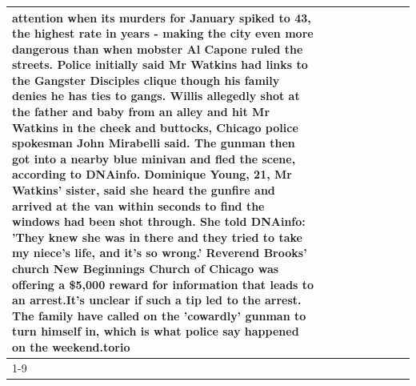 \begin{table}[H]
\begin{tabular}{lllrlllll}
attention when its murders for January spiked to 43, the highest rate in years - making the city even more dangerous than when mobster Al Capone ruled the streets. Police initially said Mr Watkins had links to the Gangster Disciples clique though his family denies he has ties to gangs. Willis allegedly shot at the father and baby from an alley and hit Mr Watkins in the cheek and buttocks, Chicago police spokesman John Mirabelli said. The gunman then got into a nearby blue minivan and fled the scene, according to DNAinfo. Dominique Young, 21, Mr Watkins' sister, said she heard the gunfire and arrived at the van within seconds to find the windows had been shot through. She told DNAinfo: 'They knew she was in there and they tried to take my niece's life, and it's so wrong.' Reverend Brooks' church New Beginnings Church of Chicago was offering a \$5,000 reward for information that leads to an arrest.It's unclear if such a tip led to the arrest. The family have called on the 'cowardly' gunman to turn himself in, which is what police say happened on the weekend.torio \\
\cline{1-9}

\end{tabular}
\end{table}

